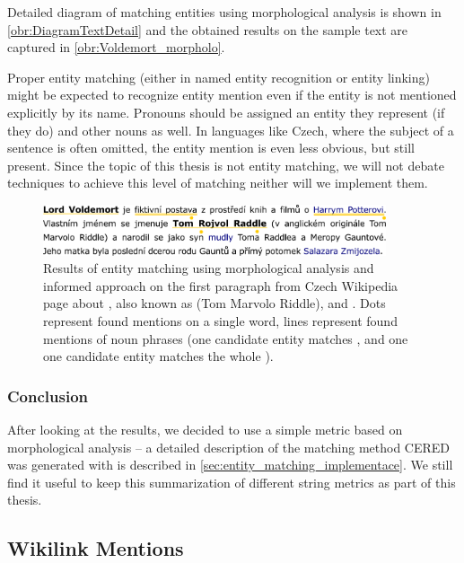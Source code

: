 Detailed diagram of matching entities using morphological analysis is shown in \autoref{obr:DiagramTextDetail} and the obtained results on the sample text are captured in \autoref{obr:Voldemort_morpholo}.


 Proper entity matching (either in named entity recognition or entity linking) might be expected to recognize entity mention even if the entity is not mentioned explicitly by its name. Pronouns should be assigned an entity they represent (if they do) and other nouns as well. In languages like Czech, where the subject of a sentence is often omitted, the entity mention is even less obvious, but still present. Since the topic of this thesis is not entity matching, we will not debate techniques to achieve this level of matching neither will we implement them.


\begin{figure}
\centering
\includegraphics[width = 0.9\textwidth]{./img/Voldemort_lexical}

\caption{Results of entity matching using morphological analysis and informed approach on the first paragraph from Czech Wikipedia page about  , also known as  (Tom Marvolo Riddle),  and . Dots represent found mentions on a single word, lines represent found mentions of noun phrases (one candidate entity matches , and one one candidate entity matches the whole ). }
\label{obr:Voldemort_morpholo}
\end{figure}



\subsubsection{Conclusion}
After looking at the results, we decided to use a simple metric based on morphological analysis -- a detailed description of the matching method CERED was generated with is described in \autoref{sec:entity_matching_implementace}. We still find it useful to keep this summarization of different string metrics as part of this thesis.


\subsection{Wikilink Mentions}

